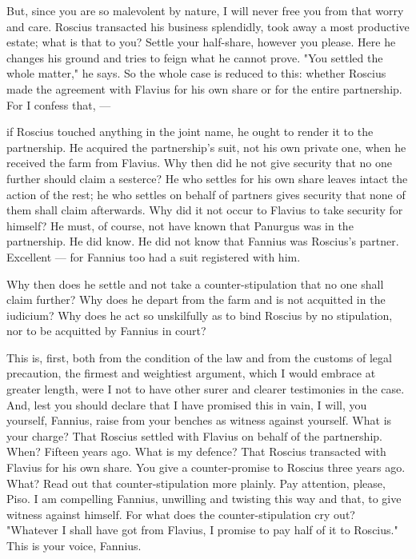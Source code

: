  But, since you are so malevolent by nature, I will never free you from that worry and care. Roscius transacted his business splendidly, took away a most productive estate; what is that to you? Settle your half-share, however you please. Here he changes his ground and tries to feign what he cannot prove. "You settled the whole matter," he says. So the whole case is reduced to this: whether Roscius made the agreement with Flavius for his own share or for the entire partnership. For I confess that, ---

 if Roscius touched anything in the joint name, he ought to render it to the partnership. He acquired the partnership's suit, not his own private one, when he received the farm from Flavius. Why then did he not give security that no one further should claim a sesterce? He who settles for his own share leaves intact the action of the rest; he who settles on behalf of partners gives security that none of them shall claim afterwards. Why did it not occur to Flavius to take security for himself? He must, of course, not have known that Panurgus was in the partnership. He did know. He did not know that Fannius was Roscius's partner. Excellent --- for Fannius too had a suit registered with him.

 Why then does he settle and not take a counter-stipulation that no one shall claim further? Why does he depart from the farm and is not acquitted in the iudicium? Why does he act so unskilfully as to bind Roscius by no stipulation, nor to be acquitted by Fannius in court?

 This is, first, both from the condition of the law and from the customs of legal precaution, the firmest and weightiest argument, which I would embrace at greater length, were I not to have other surer and clearer testimonies in the case. And, lest you should declare that I have promised this in vain, I will, you yourself, Fannius, raise from your benches as witness against yourself. What is your charge? That Roscius settled with Flavius on behalf of the partnership. When? Fifteen years ago. What is my defence? That Roscius transacted with Flavius for his own share. You give a counter-promise to Roscius three years ago. What? Read out that counter-stipulation more plainly. Pay attention, please, Piso. I am compelling Fannius, unwilling and twisting this way and that, to give witness against himself. For what does the counter-stipulation cry out? "Whatever I shall have got from Flavius, I promise to pay half of it to Roscius." This is your voice, Fannius.

